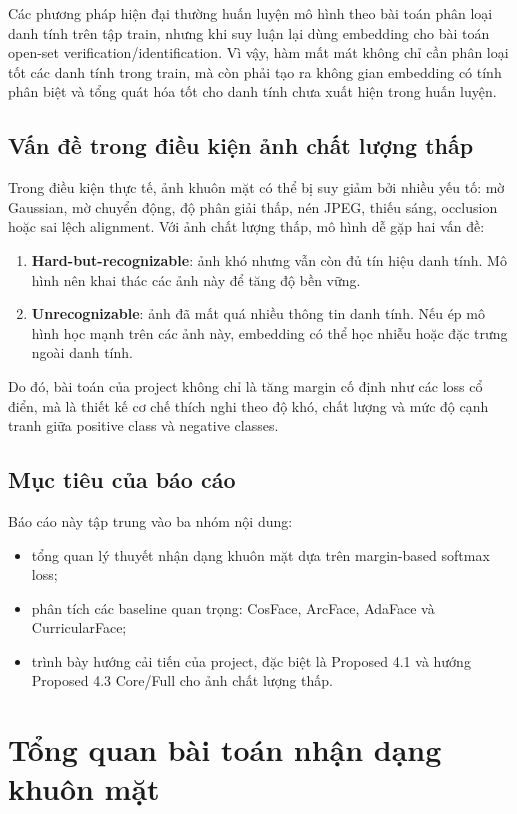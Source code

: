 \documentclass[13pt,a4paper]{extreport}
\begin{document}
Các phương pháp hiện đại thường huấn luyện mô hình theo bài toán phân loại danh tính trên tập train, nhưng khi suy luận lại dùng embedding cho bài toán open-set verification/identification. Vì vậy, hàm mất mát không chỉ cần phân loại tốt các danh tính trong train, mà còn phải tạo ra không gian embedding có tính phân biệt và tổng quát hóa tốt cho danh tính chưa xuất hiện trong huấn luyện.

\section{Vấn đề trong điều kiện ảnh chất lượng thấp}
Trong điều kiện thực tế, ảnh khuôn mặt có thể bị suy giảm bởi nhiều yếu tố: mờ Gaussian, mờ chuyển động, độ phân giải thấp, nén JPEG, thiếu sáng, occlusion hoặc sai lệch alignment. Với ảnh chất lượng thấp, mô hình dễ gặp hai vấn đề:
\begin{enumerate}[leftmargin=1.2cm]
    \item \textbf{Hard-but-recognizable}: ảnh khó nhưng vẫn còn đủ tín hiệu danh tính. Mô hình nên khai thác các ảnh này để tăng độ bền vững.
    \item \textbf{Unrecognizable}: ảnh đã mất quá nhiều thông tin danh tính. Nếu ép mô hình học mạnh trên các ảnh này, embedding có thể học nhiễu hoặc đặc trưng ngoài danh tính.
\end{enumerate}

Do đó, bài toán của project không chỉ là tăng margin cố định như các loss cổ điển, mà là thiết kế cơ chế thích nghi theo độ khó, chất lượng và mức độ cạnh tranh giữa positive class và negative classes.

\section{Mục tiêu của báo cáo}
Báo cáo này tập trung vào ba nhóm nội dung:
\begin{itemize}[leftmargin=1.2cm]
    \item tổng quan lý thuyết nhận dạng khuôn mặt dựa trên margin-based softmax loss;
    \item phân tích các baseline quan trọng: CosFace, ArcFace, AdaFace và CurricularFace;
    \item trình bày hướng cải tiến của project, đặc biệt là Proposed 4.1 và hướng Proposed 4.3 Core/Full cho ảnh chất lượng thấp.
\end{itemize}

\chapter{Tổng quan bài toán nhận dạng khuôn mặt}
\end{document}
